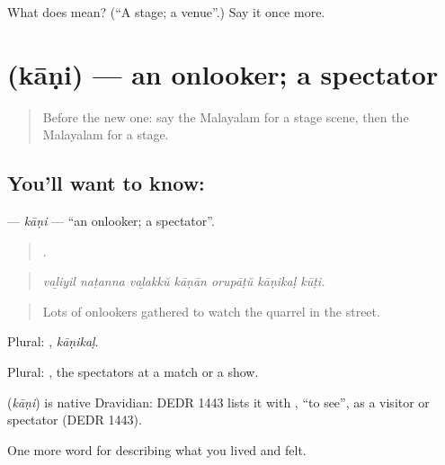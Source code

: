 \begin{tcolorbox}[breakable,colback=teal!4,colframe=teal!35!black,title={Before you move on}]
What does  mean? (\textquotedblleft{}A stage; a venue\textquotedblright{}.) Say it once more.
\end{tcolorbox}
\section[\texorpdfstring{\ml{കാണി} (kāṇi)}{കാണി (kāṇi)}]{ (kāṇi) — an onlooker; a spectator}

\label{lesson:ML-C563-kani}



\begin{quote}
Before the new one: say the Malayalam for a stage scene, then the Malayalam for a stage.
\end{quote}

\subsection*{You'll want to know: }
\textbf{} — \emph{kāṇi} — \textquotedblleft{}an onlooker; a spectator\textquotedblright{}.

\begin{quote}
      .
\end{quote}

\begin{quote}
\emph{vaḻiyil naṭanna vaḻakkŭ kāṇān orupāṭŭ kāṇikaḷ kūṭi.}
\end{quote}

\begin{quote}
Lots of onlookers gathered to watch the quarrel in the street.
\end{quote}

Plural: , \emph{kāṇikaḷ}.

Plural: , the spectators at a match or a show.

\begin{cousinweb}
\textbf{} (\emph{kāṇi}) is native Dravidian: DEDR 1443 lists it with , \textquotedblleft{}to see\textquotedblright{}, as a visitor or spectator (DEDR 1443).
\end{cousinweb}

\begin{grammarlens}[title={What you've built}]
One more word for describing what you lived and felt.
\end{grammarlens}

